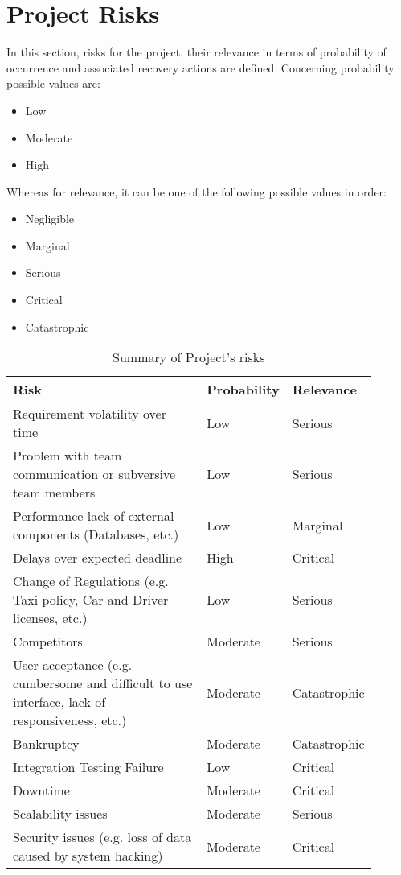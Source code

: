 \newpage
\section{Project Risks}
In this section, risks for the project, their relevance in terms of probability of occurrence and associated recovery actions are defined.
Concerning probability possible values are:
\begin{itemize}
	\item Low
	\item Moderate
	\item High
\end{itemize}
Whereas for relevance, it can be one of the following possible values in order:
\begin{itemize}
	\item Negligible
	\item Marginal
	\item Serious
	\item Critical
	\item Catastrophic
\end{itemize}
\begin{table}[H]
	\centering
	\begin{tabular}{p{0.6\linewidth}x{0.15\linewidth}x{0.15\linewidth}}
	\hline
	\textbf{Risk} & \textbf{Probability} & \textbf{Relevance} \\
	\hline
	Requirement volatility over time & Low & Serious \\
	Problem with team communication or subversive team members & Low & Serious \\
	Performance lack of external components (Databases, etc.) & Low & Marginal \\
	Delays over expected deadline & High & Critical \\ 
	Change of Regulations (e.g. Taxi policy, Car and Driver licenses, etc.) & Low & Serious \\
	Competitors & Moderate & Serious \\
	User acceptance (e.g. cumbersome and difficult to use interface, lack of responsiveness, etc.) & Moderate & Catastrophic \\
	Bankruptcy & Moderate & Catastrophic \\
	Integration Testing Failure & Low & Critical \\
	Downtime & Moderate & Critical \\
	Scalability issues & Moderate & Serious \\
	Security issues (e.g. loss of data caused by system hacking) & Moderate & Critical \\
	\hline
	\end{tabular}
	\caption{Summary of Project's risks}
\end{table} 
